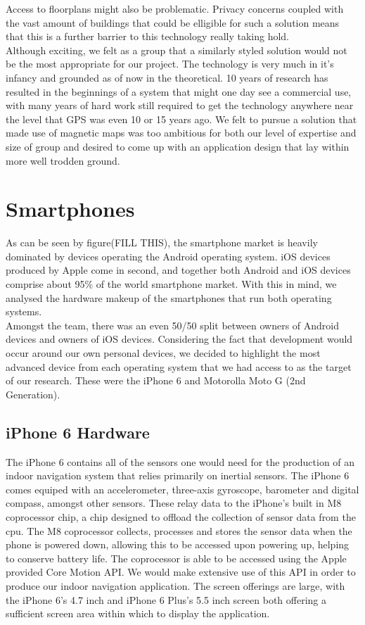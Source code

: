 \documentclass[main.tex]{subfiles}
\begin{document}
 Access to floorplans might also be problematic. Privacy concerns coupled with the vast amount of buildings that could be elligible for such a solution means that this is a further barrier to this technology really taking hold.\\
 
 Although exciting, we felt as a group that a similarly styled solution would not be the most appropriate for our project. The technology is very much in it's infancy and grounded as of now in the theoretical. 10 years of research has resulted in the beginnings of a system that might one day see a commercial use, with many years of hard work still required to get the technology anywhere near the level that GPS was even 10 or 15 years ago. We felt to pursue a solution that made use of magnetic maps was too ambitious for both our level of expertise and size of group and desired to come up with an application design that lay within more well trodden ground.
 

\section*{Smartphones}

As can be seen by figure(FILL THIS), the smartphone market is heavily dominated by devices operating the Android operating system. iOS devices produced by Apple come in second, and together both Android and iOS devices comprise about 95\% of the world smartphone market. With this in mind, we analysed the hardware makeup of the smartphones that run both operating systems. \\

Amongst the team, there was an even 50/50 split between owners of Android devices and owners of iOS devices. Considering the fact that development would occur around our own personal devices, we decided to highlight the most advanced device from each operating system that we had access to as the target of our research. These were the iPhone 6 and Motorolla Moto G (2nd Generation).

\subsection*{iPhone 6 Hardware}

The iPhone 6 contains all of the sensors one would need for the production of an indoor navigation system that relies primarily on inertial sensors. The iPhone 6 comes equiped with an accelerometer, three-axis gyroscope, barometer and digital compass, amongst other sensors. These relay data to the iPhone's built in M8 coprocessor chip, a chip designed to offload the collection of sensor data from the cpu. The M8 coprocessor collects, processes and stores the sensor data when the phone is powered down, allowing this to be accessed upon powering up, helping to conserve battery life. The coprocessor is able to be accessed using the Apple provided Core Motion API. We would make extensive use of this API in order to produce our indoor navigation application. The screen offerings are large, with the iPhone 6's 4.7 inch and iPhone 6 Plus's 5.5 inch screen both offering a sufficient screen area within which to display the application.
\end{document}
